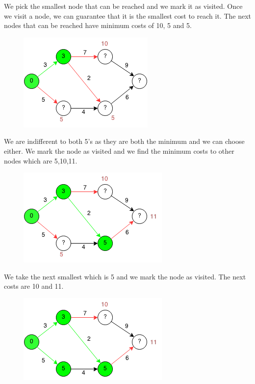 \documentclass[11pt,oneside]{book}
\makeatletter
\def\maxwidth#1{\ifdim\Gin@nat@width>#1 #1\else\Gin@nat@width\fi}
\makeatother
\begin{document}
We pick the smallest node that can be reached and we mark it as visited. Once we visit a node, we can guarantee that it is the smallest cost to reach it. The next nodes that can be reached have minimum costs of 10, 5 and 5.

\vspace{5px}\begin{figure}[H]\centering
        \includegraphics[width=0.66\maxwidth{\textwidth}]{djikstra2.png}
        \end{figure}

We are indifferent to both 5's as they are both the minimum and we can choose either. We mark the node as visited and we find the minimum costs to other nodes which are 5,10,11.

\vspace{5px}\begin{figure}[H]\centering
        \includegraphics[width=0.66\maxwidth{\textwidth}]{djikstra3.png}
        \end{figure}

We take the next smallest which is 5 and we mark the node as visited. The next costs are 10 and 11.

\vspace{5px}\begin{figure}[H]\centering
        \includegraphics[width=0.66\maxwidth{\textwidth}]{djikstra4.png}
        \end{figure}
\end{document}
